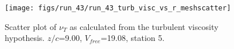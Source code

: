 \begin{figure}[H]
\centering
\texttt{[image: figs/run\_43/run\_43\_turb\_visc\_vs\_r\_meshscatter]}
\caption{Scatter plot of $\nu_T$ as calculated from the turbulent viscosity hypothesis. $z/c$=9.00, $V_{free}$=19.08, station 5.}
\label{fig:run_43_turb_visc_vs_r_meshscatter}
\end{figure}


